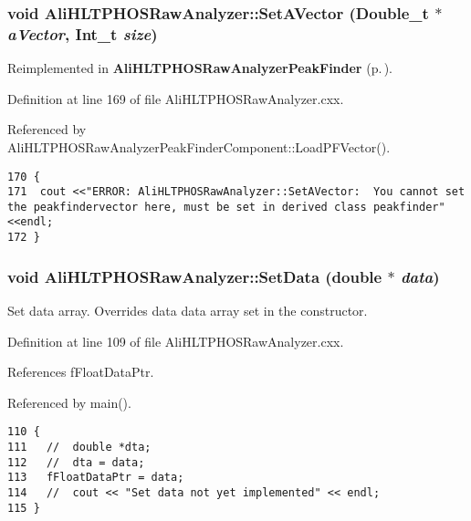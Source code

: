 \subsubsection{\setlength{\rightskip}{0pt plus 5cm}void Ali\-HLTPHOSRaw\-Analyzer::Set\-AVector (Double\_\-t $\ast$ {\em a\-Vector}, Int\_\-t {\em size})\hspace{0.3cm}{\tt  [virtual]}}\label{classAliHLTPHOSRawAnalyzer_AliHLTPHOSRawAnalyzerLMSa17}




Reimplemented in {\bf Ali\-HLTPHOSRaw\-Analyzer\-Peak\-Finder} {\rm (p.\,\pageref{classAliHLTPHOSRawAnalyzerPeakFinder_AliHLTPHOSRawAnalyzerPeakFindera5})}.

Definition at line 169 of file Ali\-HLTPHOSRaw\-Analyzer.cxx.

Referenced by Ali\-HLTPHOSRaw\-Analyzer\-Peak\-Finder\-Component::Load\-PFVector().

\footnotesize\begin{verbatim}170 {
171  cout <<"ERROR: AliHLTPHOSRawAnalyzer::SetAVector:  You cannot set the peakfindervector here, must be set in derived class peakfinder"<<endl;
172 }
\end{verbatim}\normalsize 


\subsubsection{\setlength{\rightskip}{0pt plus 5cm}void Ali\-HLTPHOSRaw\-Analyzer::Set\-Data (double $\ast$ {\em data})}\label{classAliHLTPHOSRawAnalyzer_AliHLTPHOSRawAnalyzerPeakFindera12}


Set data array. Overrides data data array set in the constructor. 

Definition at line 109 of file Ali\-HLTPHOSRaw\-Analyzer.cxx.

References f\-Float\-Data\-Ptr.

Referenced by main().

\footnotesize\begin{verbatim}110 {
111   //  double *dta;
112   //  dta = data;
113   fFloatDataPtr = data;
114   //  cout << "Set data not yet implemented" << endl;
115 }
\end{verbatim}\normalsize 


